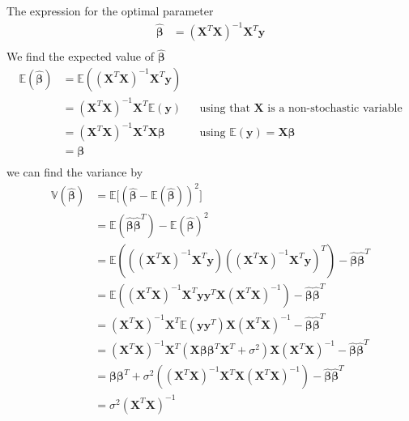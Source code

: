 The expression for the optimal parameter 
\begin{align*}
    \boldsymbol{\hat{\beta}} &= (\boldsymbol{X}^{T} \boldsymbol{X})^{-1} \boldsymbol{X}^{T} \boldsymbol{y} \\
\end{align*}
We find the expected value of $\boldsymbol{\hat{\beta}}$
\begin{align*}
    \mathbb{E}(\boldsymbol{\hat{\beta}}) &= \mathbb{E}((\boldsymbol{X}^{T} \boldsymbol{X})^{-1} \boldsymbol{X}^{T} \boldsymbol{y}) \\
    &= (\boldsymbol{X}^{T} \boldsymbol{X})^{-1} \boldsymbol{X}^{T} \mathbb{E}(\boldsymbol{y}) && \text{using that $\boldsymbol{X}$ is a non-stochastic variable} \\
    &= (\boldsymbol{X}^{T} \boldsymbol{X})^{-1} \boldsymbol{X}^{T} \boldsymbol{X} \boldsymbol{\beta} && \text{using $\mathbb{E}(\boldsymbol{y}) = \boldsymbol{X} \boldsymbol{\beta}$} \\
    &= \boldsymbol{\beta} \\
\end{align*}
we can find the variance by 
\begin{align*}
    \mathbb{V}(\boldsymbol{\hat{\beta}}) &= \mathbb{E} \big[ (\boldsymbol{\hat{\beta}} - \mathbb{E}(\boldsymbol{\hat{\beta}}))^{2} \big] \\
    &= \mathbb{E} (\boldsymbol{\hat{\beta}} \boldsymbol{\hat{\beta}}^{T}) - \mathbb{E}(\boldsymbol{\hat{\beta}})^{2}  \\
    &= \mathbb{E} (((\boldsymbol{X}^{T} \boldsymbol{X})^{-1} \boldsymbol{X}^{T} \boldsymbol{y}) ((\boldsymbol{X}^{T} \boldsymbol{X})^{-1} \boldsymbol{X}^{T} \boldsymbol{y})^{T}) - \boldsymbol{\hat{\beta}}\boldsymbol{\hat{\beta}}^{T}  \\
    &= \mathbb{E} ((\boldsymbol{X}^{T} \boldsymbol{X})^{-1} \boldsymbol{X}^{T} \boldsymbol{y} \boldsymbol{y}^{T} \boldsymbol{X} (\boldsymbol{X}^{T} \boldsymbol{X})^{-1}) - \boldsymbol{\hat{\beta}}\boldsymbol{\hat{\beta}}^{T}  \\
    &= (\boldsymbol{X}^{T} \boldsymbol{X})^{-1} \boldsymbol{X}^{T} \mathbb{E} (\boldsymbol{y} \boldsymbol{y}^{T}) \boldsymbol{X} (\boldsymbol{X}^{T} \boldsymbol{X})^{-1} - \boldsymbol{\hat{\beta}}\boldsymbol{\hat{\beta}}^{T}  \\
    &= (\boldsymbol{X}^{T} \boldsymbol{X})^{-1} \boldsymbol{X}^{T} (\boldsymbol{X} \boldsymbol{\beta} \boldsymbol{\beta}^{T} \boldsymbol{X}^{T} + \sigma^{2}) \boldsymbol{X} (\boldsymbol{X}^{T} \boldsymbol{X})^{-1} - \boldsymbol{\hat{\beta}}\boldsymbol{\hat{\beta}}^{T}  \\
    &= \boldsymbol{\beta} \boldsymbol{\beta}^{T} + \sigma^{2}((\boldsymbol{X}^{T} \boldsymbol{X})^{-1} \boldsymbol{X}^{T} \boldsymbol{X} (\boldsymbol{X}^{T} \boldsymbol{X})^{-1}) - \boldsymbol{\hat{\beta}}\boldsymbol{\hat{\beta}}^{T}  \\
    &= \sigma^{2}(\boldsymbol{X}^{T} \boldsymbol{X})^{-1} \\
\end{align*}
